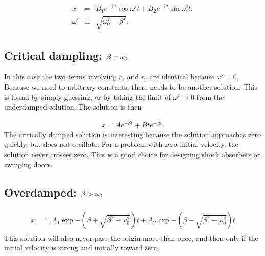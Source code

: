 \documentclass[letterpaper,10pt,english]{sphinxmanual}
\begin{document}
\begin{equation*}
\begin{split}
\begin{eqnarray}
\label{eq:homogsolution} \tag{55}
x&=&B_1e^{-\beta t}\cos\omega't+B_2e^{-\beta t}\sin\omega't,\\
\nonumber 
\omega'&\equiv&\sqrt{\omega_0^2-\beta^2}.
\end{eqnarray}
\end{split}
\end{equation*}

\subsection{Critical dampling: \protect\(\beta=\omega_0\protect\)}
\label{\detokenize{chapter1:critical-dampling-beta-omega-0}}
In this case the two terms involving \(r_1\) and \(r_2\) are identical
because \(\omega'=0\). Because we need to arbitrary constants, there
needs to be another solution. This is found by simply guessing, or by
taking the limit of \(\omega'\rightarrow 0\) from the underdamped
solution. The solution is then




\begin{equation*}
\begin{split}
\begin{equation}
\label{eq:criticallydamped} \tag{56}
x=Ae^{-\beta t}+Bte^{-\beta t}.
\end{equation}
\end{split}
\end{equation*}
The critically damped solution is interesting because the solution
approaches zero quickly, but does not oscillate. For a problem with
zero initial velocity, the solution never crosses zero. This is a good
choice for designing shock absorbers or swinging doors.


\subsection{Overdamped: \protect\(\beta>\omega_0\protect\)}
\label{\detokenize{chapter1:overdamped-beta-omega-0}}\begin{equation*}
\begin{split}
\begin{eqnarray}
x&=&A_1\exp{-(\beta+\sqrt{\beta^2-\omega_0^2})t}+A_2\exp{-(\beta-\sqrt{\beta^2-\omega_0^2})t}
\end{eqnarray}
\end{split}
\end{equation*}
This solution will also never pass the origin more than once, and then
only if the initial velocity is strong and initially toward zero.
\end{document}
